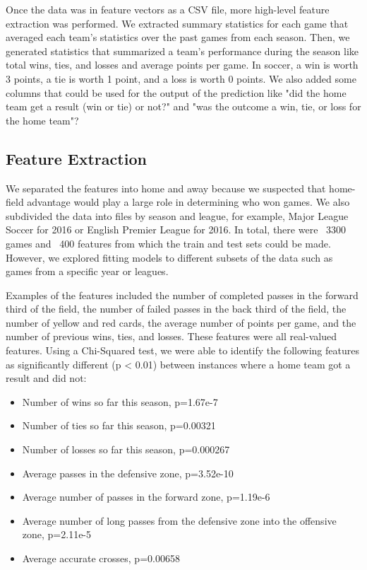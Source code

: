 Once the data was in feature vectors as a CSV file, more high-level feature extraction was performed. We extracted summary statistics for each game that averaged each team's statistics over the past games from each season. Then, we generated statistics that summarized a team's performance during the season like total wins, ties, and losses and average points per game. In soccer, a win is worth 3 points, a tie is worth 1 point, and a loss is worth 0 points. We also added some columns that could be used for the output of the prediction like "did the home team get a result (win or tie) or not?" and "was the outcome a win, tie, or loss for the home team"? 

\subsection{Feature Extraction}
We separated the features into home and away because we suspected that home-field advantage would play a large role in determining who won games. We also subdivided the data into files by season and league, for example, Major League Soccer for 2016 or English Premier League for 2016. In total, there were ~3300 games and ~400 features from which the train and test sets could be made. However, we explored fitting models to different subsets of the data such as games from a specific year or leagues.

Examples of the features included the number of completed passes in the forward third of the field, the number of failed passes in the back third of the field, the number of yellow and red cards, the average number of points per game, and the number of previous wins, ties, and losses. These features were all real-valued features. Using a Chi-Squared test, we were able to identify the following features as significantly different (p < 0.01) between instances where a home team got a result and did not:

\begin{itemize}
\item Number of wins so far this season, p=1.67e-7
\item Number of ties so far this season, p=0.00321
\item Number of losses so far this season, p=0.000267
\item Average passes in the defensive zone, p=3.52e-10
\item Average number of passes in the forward zone, p=1.19e-6
\item Average number of long passes from the defensive zone into the offensive zone, p=2.11e-5
\item Average accurate crosses, p=0.00658
\end{itemize}


